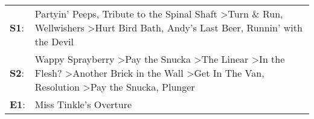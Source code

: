 \begin{supertabular}{p{0.03\textwidth}p{0.92\textwidth}}
 \textbf{S1}:  &                                                                                                                    Partyin' Peeps\textsuperscript{}, \enspace Tribute to the Spinal Shaft\textsuperscript{} \textgreater \enspace Turn \& Run\textsuperscript{}, \enspace Wellwishers\textsuperscript{} \textgreater \enspace Hurt Bird Bath\textsuperscript{}, \enspace Andy's Last Beer\textsuperscript{}, \enspace Runnin' with the Devil\textsuperscript{}  \enspace  \\
 \textbf{S2}:  &  Wappy Sprayberry\textsuperscript{} \textgreater \enspace Pay the Snucka\textsuperscript{} \textgreater \enspace The Linear\textsuperscript{} \textgreater \enspace In the Flesh?\textsuperscript{} \textgreater \enspace Another Brick in the Wall\textsuperscript{} \textgreater \enspace Get In The Van\textsuperscript{}, \enspace Resolution\textsuperscript{} \textgreater \enspace Pay the Snucka\textsuperscript{}, \enspace Plunger\textsuperscript{}  \enspace  \\
 \textbf{E1}:  &                                                                                                                                                                                                                                                                                                                                                                                                                       Miss Tinkle's Overture\textsuperscript{}  \enspace  \\
\end{supertabular}
